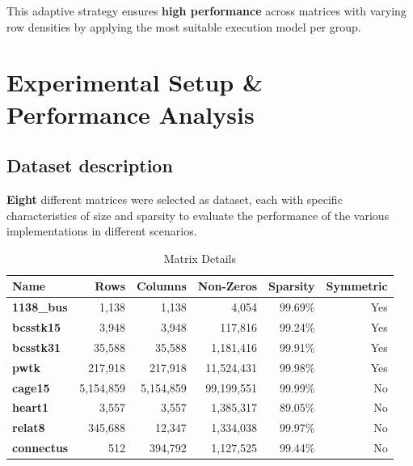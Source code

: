 \documentclass[conference]{IEEEtran}
\begin{document}
    This adaptive strategy ensures \textbf{high performance} across matrices
    with varying row densities by applying the most suitable execution model
    per group. 

    \section{Experimental Setup \& Performance Analysis}
        \subsection{Dataset description}
        
        \textbf{Eight} different matrices were selected as dataset, each with
        specific characteristics of size and sparsity to evaluate the
        performance of the various implementations in different scenarios.

        \begin{table}[ht]
            \caption{Matrix Details}
            \label{tab:matrix_details}
            \centering
            \begin{adjustbox}{width=\columnwidth}
            \begin{tabular}{lrrr|rr}
            \toprule
                \textbf{Name} & \textbf{Rows} & \textbf{Columns} & \textbf{Non-Zeros} & \textbf{Sparsity} & \textbf{Symmetric} \\
            \midrule
                \textbf{1138\_bus} & 1,138 & 1,138 & 4,054 & 99.69\% & Yes \\
                \textbf{bcsstk15} & 3,948 & 3,948 & 117,816 & 99.24\% & Yes \\
                \textbf{bcsstk31} & 35,588 & 35,588 & 1,181,416 & 99.91\% & Yes \\
                \textbf{pwtk} & 217,918 & 217,918 & 11,524,431 & 99.98\% & Yes \\
                \textbf{cage15} & 5,154,859 & 5,154,859 & 99,199,551 & 99.99\% & No \\
                \textbf{heart1} & 3,557 & 3,557 & 1,385,317 & 89.05\% & No \\
                \textbf{relat8} & 345,688 & 12,347 & 1,334,038 & 99.97\% & No \\
                \textbf{connectus} & 512 & 394,792 & 1,127,525 & 99.44\% & No \\
            \bottomrule
            \end{tabular}
            \end{adjustbox}
        \end{table}
\end{document}
